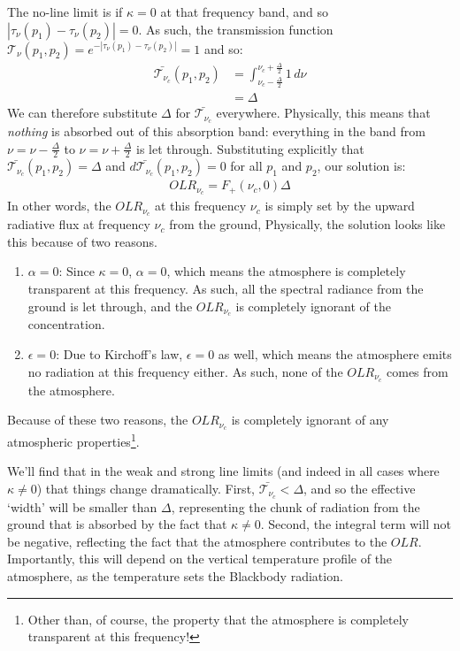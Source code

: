 The no-line limit is if $\kappa=0$ at that frequency band, and so $|\tau_\nu(p_1)-\tau_\nu(p_2)|=0$. As such, the transmission function $\mathcal{T}_{\nu}(p_1,p_2)=e^{-|\tau_\nu(p_1)-\tau_\nu(p_2)|}=1$ and so:
\begin{align*}
    \bar{\mathcal{T}_{\nu_c}}(p_1,p_2)&=\int_{\nu_c-\frac{\Delta}{2}}^{\nu_c+\frac{\Delta}{2}} 1 \,d\nu\\
    &=\Delta
\end{align*}
We can therefore substitute $\Delta$ for $\bar{\mathcal{T}_{\nu_c}}$ everywhere. Physically, this means that \textit{nothing} is absorbed out of this absorption band: everything in the band from $\nu=\nu-\frac{\Delta}{2}$ to $\nu=\nu+\frac{\Delta}{2}$ is let through. Substituting explicitly that $\bar{\mathcal{T}_{\nu_c}}(p_1,p_2)=\Delta$ and $d\bar{\mathcal{T}_{\nu_c}}(p_1,p_2)=0$ for all $p_1$ and $p_2$, our solution is:
\begin{align*}
    OLR_{\nu_c}=F_+(\nu_c,0)\Delta
\end{align*}
In other words, the $OLR_{\nu_c}$ at this frequency $\nu_c$ is simply set by the upward radiative flux at frequency $\nu_c$ from the ground, Physically, the solution looks like this because of two reasons.
\begin{enumerate}
    \item $\alpha=0$: Since $\kappa=0$, $\alpha=0$, which means the atmosphere is completely transparent at this frequency. As such, all the spectral radiance from the ground is let through, and the $OLR_{\nu_c}$ is completely ignorant of the concentration.
    \item $\epsilon=0$: Due to Kirchoff's law, $\epsilon=0$ as well, which means the atmosphere emits no radiation at this frequency either. As such, none of the $OLR_{\nu_c}$ comes from the atmosphere.
\end{enumerate}
Because of these two reasons, the $OLR_{\nu_c}$ is completely ignorant of any atmospheric properties\footnote{
    Other than, of course, the property that the atmosphere is completely transparent at this frequency!
}.

We'll find that in the weak and strong line limits (and indeed in all cases where $\kappa\neq0$) that things change dramatically. First, $\bar{\mathcal{T}_{\nu_c}}<\Delta$, and so the effective `width' will be smaller than $\Delta$, representing the chunk of radiation from the ground that is absorbed by the fact that $\kappa\neq0$. Second, the integral term will not be negative, reflecting the fact that the atmosphere contributes to the $OLR$. Importantly, this will depend on the vertical temperature profile of the atmosphere, as the temperature sets the Blackbody radiation.

